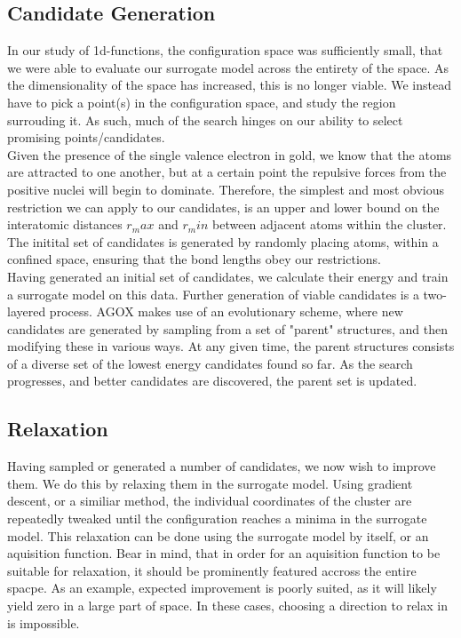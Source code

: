 \documentclass[working, oneside]{../../../Preambles/marginclass}
\begin{document}
\subsection{Candidate Generation}
In our study of 1d-functions, the configuration space was sufficiently small, that we were able to evaluate our surrogate model across the entirety of the space. As the dimensionality of the space has increased, this is no longer viable. We instead have to pick a point(s) in the configuration space, and study the region surrouding it. As such, much of the search hinges on our ability to select promising points/candidates. \\ 
Given the presence of the single valence electron in gold, we know that the atoms are attracted to one another, but at a certain point the repulsive forces from the positive nuclei will begin to dominate. Therefore, the simplest and most obvious restriction we can apply to our candidates, is an upper and lower bound on the interatomic distances $r_max$ and $r_min$ between adjacent atoms within the cluster. The initital set of candidates is generated by randomly placing atoms, within a confined space, ensuring that the bond lengths obey our restrictions.
\\
Having generated an initial set of candidates, we calculate their energy and train a surrogate model on this data. Further generation of viable candidates is a two-layered process. AGOX makes use of an evolutionary scheme, where new candidates are generated by sampling from a set of "parent" structures, and then modifying these in various ways. At any given time, the parent structures consists of a diverse set of the lowest energy candidates found so far. As the search progresses, and better candidates are discovered, the parent set is updated.
\subsection{Relaxation}
Having sampled or generated a number of candidates, we now wish to improve them. We do this by relaxing them in the surrogate model. Using gradient descent, or a similiar method, the individual coordinates of the cluster are repeatedly tweaked until the configuration reaches a minima in the surrogate model. This relaxation can be done using the surrogate model by itself, or an aquisition function. Bear in mind, that in order for an aquisition function to be suitable for relaxation, it should be prominently featured accross the entire spacpe. As an example, expected improvement is poorly suited, as it will likely yield zero in a large part of space. In these cases, choosing a direction to relax in is impossible.
\end{document}
